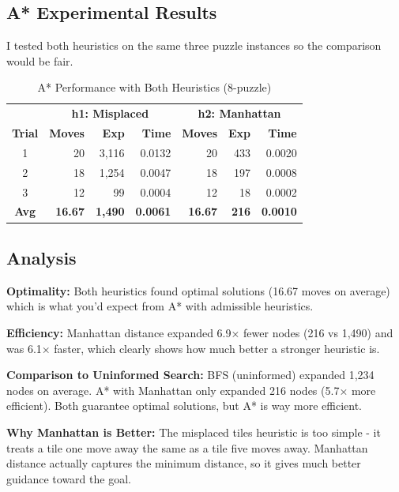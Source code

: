 \documentclass[letterpaper]{article}
\begin{document}
\subsection{A* Experimental Results}

I tested both heuristics on the same three puzzle instances so the comparison would be fair.

\begin{table}[h]
\centering
\tiny
\begin{tabular}{crrr|rrr}
\toprule
& \multicolumn{3}{c}{\textbf{h1: Misplaced}} & \multicolumn{3}{c}{\textbf{h2: Manhattan}} \\
\cmidrule(lr){2-4} \cmidrule(lr){5-7}
\textbf{Trial} & \textbf{Moves} & \textbf{Exp} & \textbf{Time} & \textbf{Moves} & \textbf{Exp} & \textbf{Time} \\
\midrule
1 & 20 & 3,116 & 0.0132 & 20 & 433 & 0.0020 \\
2 & 18 & 1,254 & 0.0047 & 18 & 197 & 0.0008 \\
3 & 12 & 99 & 0.0004 & 12 & 18 & 0.0002 \\
\midrule
\textbf{Avg} & \textbf{16.67} & \textbf{1,490} & \textbf{0.0061} & \textbf{16.67} & \textbf{216} & \textbf{0.0010} \\
\bottomrule
\end{tabular}
\caption{A* Performance with Both Heuristics (8-puzzle)}
\end{table}

\subsection{Analysis}

\textbf{Optimality:} Both heuristics found optimal solutions (16.67 moves on average) which is what you'd expect from A* with admissible heuristics.

\textbf{Efficiency:} Manhattan distance expanded 6.9× fewer nodes (216 vs 1,490) and was 6.1× faster, which clearly shows how much better a stronger heuristic is.

\textbf{Comparison to Uninformed Search:} BFS (uninformed) expanded 1,234 nodes on average. A* with Manhattan only expanded 216 nodes (5.7× more efficient). Both guarantee optimal solutions, but A* is way more efficient.

\textbf{Why Manhattan is Better:} The misplaced tiles heuristic is too simple - it treats a tile one move away the same as a tile five moves away. Manhattan distance actually captures the minimum distance, so it gives much better guidance toward the goal.
\end{document}
